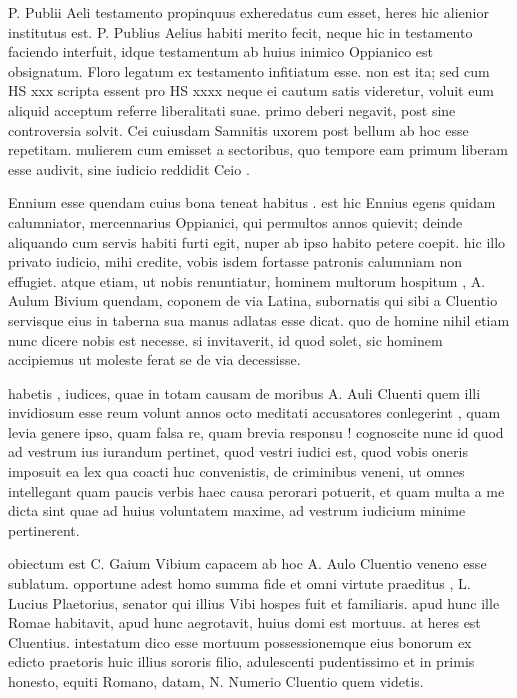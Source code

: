  P. Publii Aeli testamento propinquus exheredatus cum esset, heres hic alienior institutus est. P. Publius Aelius habiti merito fecit, neque hic in testamento faciendo interfuit, idque testamentum ab huius inimico Oppianico est obsignatum. Floro legatum ex testamento infitiatum esse. non est ita; sed cum HS xxx scripta essent pro HS xxxx neque ei cautum satis videretur, voluit eum aliquid acceptum referre liberalitati suae. primo deberi negavit, post sine controversia solvit. Cei cuiusdam Samnitis uxorem post bellum ab hoc esse repetitam. mulierem cum emisset a sectoribus, quo tempore eam primum liberam esse audivit, sine iudicio reddidit Ceio .

 Ennium esse quendam cuius bona teneat habitus . est hic Ennius egens quidam calumniator, mercennarius Oppianici, qui permultos annos quievit; deinde aliquando cum servis habiti furti egit, nuper ab ipso habito petere coepit. hic illo privato iudicio, mihi credite, vobis isdem fortasse patronis calumniam non effugiet. atque etiam, ut nobis renuntiatur, hominem multorum hospitum , A. Aulum Bivium quendam, coponem de via Latina, subornatis qui sibi a Cluentio servisque eius in taberna sua manus adlatas esse dicat. quo de homine nihil etiam nunc dicere nobis est necesse. si invitaverit, id quod solet, sic hominem accipiemus ut moleste ferat se de via decessisse.

 habetis , iudices, quae in totam causam de moribus A. Auli Cluenti quem illi invidiosum esse reum volunt annos octo meditati accusatores conlegerint , quam levia genere ipso, quam falsa re, quam brevia responsu ! cognoscite nunc id quod ad vestrum ius iurandum pertinet, quod vestri iudici est, quod vobis oneris imposuit ea lex qua coacti huc convenistis, de criminibus veneni, ut omnes intellegant quam paucis verbis haec causa perorari potuerit, et quam multa a me dicta sint quae ad huius voluntatem maxime, ad vestrum iudicium minime pertinerent.

 obiectum est C. Gaium Vibium capacem ab hoc A. Aulo Cluentio veneno esse sublatum. opportune adest homo summa fide et omni virtute praeditus , L. Lucius Plaetorius, senator qui illius Vibi hospes fuit et familiaris. apud hunc ille Romae habitavit, apud hunc aegrotavit, huius domi est mortuus. at heres est Cluentius. intestatum dico esse mortuum possessionemque eius bonorum ex edicto praetoris huic illius sororis filio, adulescenti pudentissimo et in primis honesto, equiti Romano, datam, N. Numerio Cluentio quem videtis.

